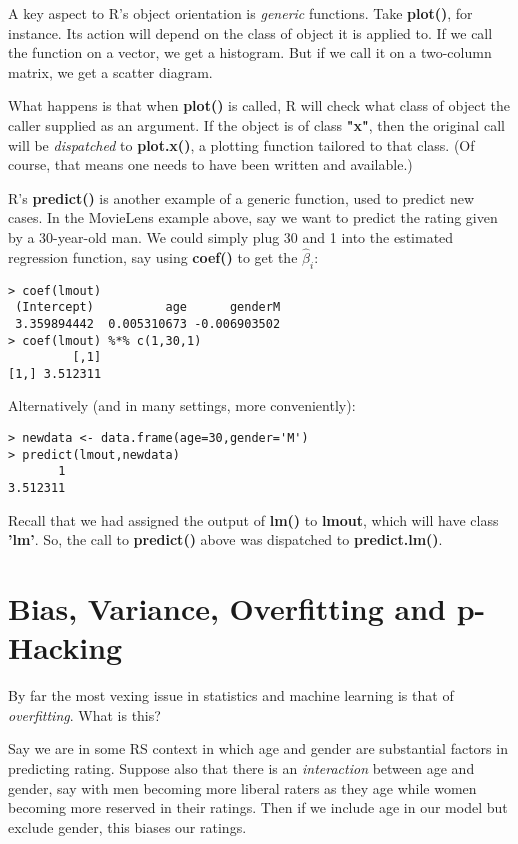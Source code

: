 A key aspect to R's object orientation is \textit{generic} functions.
Take \textbf{plot()}, for instance.  Its action will depend on the class
of object it is applied to.  If we call the function on a vector, we get
a histogram.  But if we call it on a two-column matrix, we get a scatter
diagram.

What happens is that when \textbf{plot()} is called, R will check what
class of object the caller supplied as an argument.  If the object is of
class \textbf{"x"}, then the original call will be \textit{dispatched}
to \textbf{plot.x()}, a plotting function tailored to that class.  (Of
course, that means one needs to have been written and available.)

R's \textbf{predict()} is another example of a generic function, used to
predict new cases.  In the MovieLens example above, say we want to
predict the rating given by a 30-year-old man.  We could simply plug
30 and 1 into the estimated regression function, say using
\textbf{coef()} to get the $\widehat{\beta}_i$:

\begin{lstlisting}
> coef(lmout)
 (Intercept)          age      genderM 
 3.359894442  0.005310673 -0.006903502 
> coef(lmout) %*% c(1,30,1)
         [,1]
[1,] 3.512311
\end{lstlisting}

Alternatively (and in many settings, more conveniently):

\begin{lstlisting}
> newdata <- data.frame(age=30,gender='M')
> predict(lmout,newdata)
       1 
3.512311 
\end{lstlisting}

Recall that we had assigned the output of \textbf{lm()} to
\textbf{lmout}, which will have class \textbf{'lm'}.  So, the call to
\textbf{predict()} above was dispatched to \textbf{predict.lm()}.

\section{Bias, Variance, Overfitting and p-Hacking}
\label{overfit}

By far the most vexing issue in statistics and machine learning is that
of \textit{overfitting}.  What is this?

Say we are in some RS context in which age and gender are substantial
factors in predicting rating.  Suppose also that there is an
\textit{interaction} between age and gender, say with men becoming more
liberal raters as they age while women becoming more reserved in their
ratings.  Then if we include age in our model but exclude gender, this
biases our ratings.

